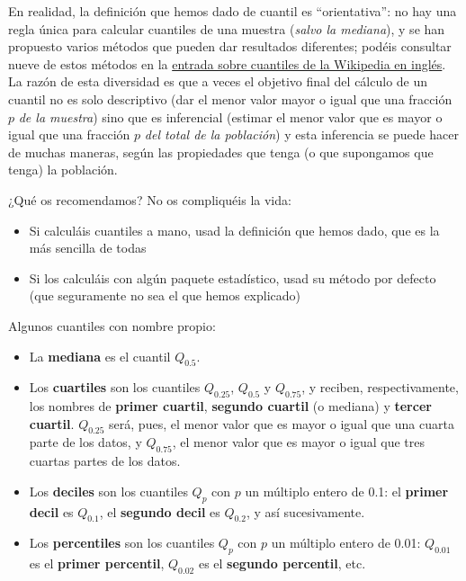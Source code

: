 \documentclass[
  spanish,
  letterpaper,
  DIV=11,
  numbers=noendperiod]{scrreprt}
\providecommand{\tightlist}{%
  \setlength{\itemsep}{0pt}\setlength{\parskip}{0pt}}
\begin{document}
\begin{tcolorbox}[enhanced jigsaw, arc=.35mm, bottomrule=.15mm, bottomtitle=1mm, breakable, colback=white, colbacktitle=quarto-callout-note-color!10!white, colframe=quarto-callout-note-color-frame, coltitle=black, left=2mm, leftrule=.75mm, opacityback=0, opacitybacktitle=0.6, rightrule=.15mm, title=\textcolor{quarto-callout-note-color}{\faInfo}\hspace{0.5em}{Nota}, titlerule=0mm, toprule=.15mm, toptitle=1mm]

En realidad, la definición que hemos dado de cuantil es ``orientativa'':
no hay una regla única para calcular cuantiles de una muestra
(\emph{salvo la mediana}), y se han propuesto varios métodos que pueden
dar resultados diferentes; podéis consultar nueve de estos métodos en la
\href{https://en.wikipedia.org/wiki/Quantile\#Estimating_quantiles_from_a_sample}{entrada
sobre cuantiles de la Wikipedia en inglés}. La razón de esta diversidad
es que a veces el objetivo final del cálculo de un cuantil no es solo
descriptivo (dar el menor valor mayor o igual que una fracción \(p\)
\emph{de la muestra}) sino que es inferencial (estimar el menor valor
que es mayor o igual que una fracción \(p\) \emph{del total de la
población}) y esta inferencia se puede hacer de muchas maneras, según
las propiedades que tenga (o que supongamos que tenga) la población.

¿Qué os recomendamos? No os compliquéis la vida:

\begin{itemize}
\tightlist
\item
  Si calculáis cuantiles a mano, usad la definición que hemos dado, que
  es la más sencilla de todas
\item
  Si los calculáis con algún paquete estadístico, usad su método por
  defecto (que seguramente no sea el que hemos explicado)
\end{itemize}

\end{tcolorbox}

Algunos cuantiles con nombre propio:

\begin{itemize}
\item
  La \textbf{mediana} es el cuantil \(Q_{0.5}\).
\item
  Los \textbf{cuartiles} son los cuantiles \(Q_{0.25}\), \(Q_{0.5}\) y
  \(Q_{0.75}\), y reciben, respectivamente, los nombres de
  \textbf{primer cuartil}, \textbf{segundo cuartil} (o mediana) y
  \textbf{tercer cuartil}. \(Q_{0.25}\) será, pues, el menor valor que
  es mayor o igual que una cuarta parte de los datos, y \(Q_{0.75}\), el
  menor valor que es mayor o igual que tres cuartas partes de los datos.
\item
  Los \textbf{deciles} son los cuantiles \(Q_{p}\) con \(p\) un múltiplo
  entero de 0.1: el \textbf{primer decil} es \(Q_{0.1}\), el
  \textbf{segundo decil} es \(Q_{0.2}\), y así sucesivamente.
\item
  Los \textbf{percentiles} son los cuantiles \(Q_{p}\) con \(p\) un
  múltiplo entero de 0.01: \(Q_{0.01}\) es el \textbf{primer percentil},
  \(Q_{0.02}\) es el \textbf{segundo percentil}, etc.
\end{itemize}
\end{document}
